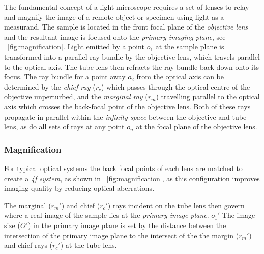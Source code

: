 
The fundamental concept of a light microscope requires a set of lenses to relay and magnify the image of a remote object or specimen using light as a measurand.
The sample is located in the front focal plane of the \emph{\gls{objective lens}} and the resultant image is focused onto the \emph{\gls{primary imaging plane}}, see \figurename~\ref{fig:magnification}.
Light emitted by a point \(o_1 \) at the sample plane is transformed into a parallel ray bundle by the \gls{objective lens}, which travels parallel to the optical axis.
The tube lens then refracts the ray bundle back down onto its focus.
The ray bundle for a point away \(o_2 \) from the optical axis can be determined by the \emph{chief ray} (\(r_c \)) which passes through the optical centre of the objective unperturbed, and the \emph{marginal ray} (\(r_m \)) travelling parallel to the optical axis which crosses the back-focal point of the \gls{objective lens}.
Both of these rays propagate in parallel within the \emph{infinity space} between the objective and tube lens, as do all sets of rays at any point \(o_n \) at the focal plane of the \gls{objective lens}.

\subsubsection{Magnification}

For typical optical systems the back focal points of each lens are matched to create a \emph{\gls{4f} system}, as shown in \figurename~\ref{fig:magnification}, as this configuration improves imaging quality by reducing optical aberrations.

The marginal (\(r_m' \)) and chief (\(r_c' \)) rays incident on the tube lens then govern where a real image of the sample lies at the \emph{primary image plane}.
\(o_1' \)
The image size (\(O' \)) in the primary image plane is set by the distance between the intersection of the primary image plane to the intersect of the the margin (\(r_m' \)) and chief rays (\(r_c' \)) at the tube lens.


